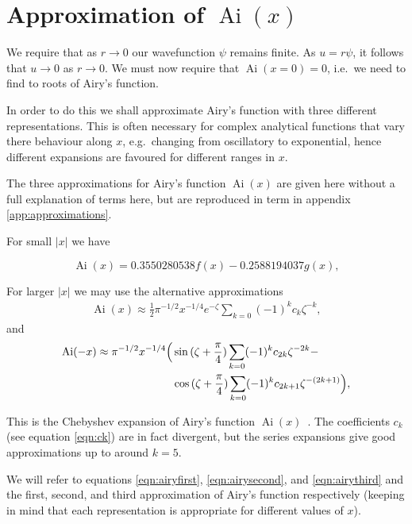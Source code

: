 \documentclass[]{article}
\renewcommand{\mod}[1]{\ensuremath{\lvert {#1} \rvert}}
\newcommand{\Ai}[1]{\ensuremath{\operatorname{Ai}({#1})}}
\begin{document}
\footnotetext{$\Ai{x} \to 0$ as $x \to \pm\infty$.}

\section{Approximation of \Ai{x}}\label{sec:approximation}

We require that as $r \to 0$ our wavefunction $\psi$ remains finite. As $u = r\psi$, it follows that $u \to 0$ as $r \to 0$. We must now require that $\Ai{x = 0} = 0$, i.e.\ we need to find to roots of Airy's function.

In order to do this we shall approximate Airy's function with three different representations. This is often necessary for complex analytical functions that vary there behaviour along $x$, e.g.\ changing from oscillatory to exponential, hence different expansions are favoured for different ranges in $x$.

The three approximations for Airy's function $\Ai{x}$ are given here without a full explanation of terms here, but are reproduced in term in appendix \ref{app:approximations}.

For small $\mod{x}$ we have

\begin{equation}\label{eqn:airyfirst}
\Ai{x} = 0.3550280538f(x) - 0.2588194037g(x),
\end{equation}

For larger $\mod{x}$ we may use the alternative approximations
\begin{align}\label{eqn:airysecond}
\Ai{x} \approx \frac{1}{2}\pi^{-1/2}x^{-1/4}e^{-\zeta} \sum\limits_{k=0} (-1)^{k}c_{k}\zeta^{-k},
\end{align}
and
\begin{equation}\label{eqn:airythird}
	\begin{split}
		\Ai{-x} \approx \pi^{-1/2}x^{-1/4}
		\Bigl(
			&\sin{(\zeta + \frac{\pi}{4})}\sum\limits_{k=0}(-1)^{k}c_{2k}\zeta^{-2k} -\\
			&\cos{(\zeta + \frac{\pi}{4})}\sum\limits_{k=0}(-1)^{k}c_{2k+1}\zeta^{-(2k+1)}
		\Bigr),
	\end{split}
\end{equation}

This is the Chebyshev expansion of Airy's function $\Ai{x}$~\cite{ref:agil}. The coefficients $c_{k}$ (see equation \ref{eqn:ck}) are in fact divergent, but the series expansions give good approximations up to around $k = 5$.

We will refer to equations \ref{eqn:airyfirst}, \ref{eqn:airysecond}, and \ref{eqn:airythird} and the first, second, and third approximation of Airy's function respectively (keeping in mind that each representation is appropriate for different values of $x$).
\end{document}
